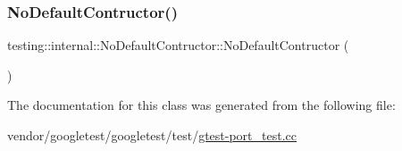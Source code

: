 \mbox{\label{classtesting_1_1internal_1_1_no_default_contructor_acba74b55a8c5341808ecb5b9318eaecf}} 
\subsubsection{\texorpdfstring{No\+Default\+Contructor()}{NoDefaultContructor()}\hspace{0.1cm}{\footnotesize\ttfamily [2/2]}}
{\footnotesize\ttfamily testing\+::internal\+::\+No\+Default\+Contructor\+::\+No\+Default\+Contructor (\begin{DoxyParamCaption}\item[{const \hyperlink{classtesting_1_1internal_1_1_no_default_contructor}{No\+Default\+Contructor} \&}]{ }\end{DoxyParamCaption})\hspace{0.3cm}{\ttfamily [inline]}}



The documentation for this class was generated from the following file\+:\begin{DoxyCompactItemize}
\item 
vendor/googletest/googletest/test/\hyperlink{gtest-port__test_8cc}{gtest-\/port\+\_\+test.\+cc}\end{DoxyCompactItemize}
